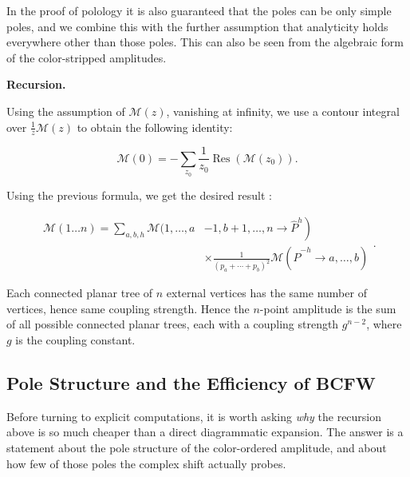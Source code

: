 In the proof of polology it is also guaranteed that the poles can be only simple poles, and we combine this with the further assumption that analyticity holds everywhere other than those poles. This can also be seen from the algebraic form of the color-stripped amplitudes.

\textbf{Recursion.}

Using the assumption of $\mathcal{M}(z)$, vanishing at infinity, we use a contour integral over $\frac{1}{z} \mathcal{M}(z)$ to obtain the following identity:

\[
	\mathcal{M}(0) = - \sum_{z_0} \frac{1}{z_0} \operatorname{Res} \left( \mathcal{M}(z_0) \right) 
.\]


Using the previous formula, we get the desired result \autocite[(27.117)]{schwartzQFT2014}:

\[
	\begin{aligned}
\mathcal{M}(1 \ldots n)=\sum_{a, b, h} \mathcal{M}(1, \ldots, a & \left.-1, b+1, \ldots, n \rightarrow \hat{P}^h\right) \\
& \times \frac{1}{\left(p_a+\cdots+p_b\right)^2} \mathcal{M}\left(\hat{P}^{-h} \rightarrow a, \ldots, b\right)
\end{aligned}
.\]

Each connected planar tree of $n$ external vertices has the same number of vertices, hence same coupling strength. Hence the $n$-point amplitude is the sum of all possible connected planar trees, each with a coupling strength $g^{n-2}$, where $g$ is the coupling constant.

\subsection{Pole Structure and the Efficiency of BCFW}
\label{subsec:efficiency-of-bcfw}

Before turning to explicit computations, it is worth asking \emph{why} the recursion above is so much cheaper than a direct diagrammatic expansion. The answer is a statement about the pole structure of the color-ordered amplitude, and about how few of those poles the complex shift actually probes.

